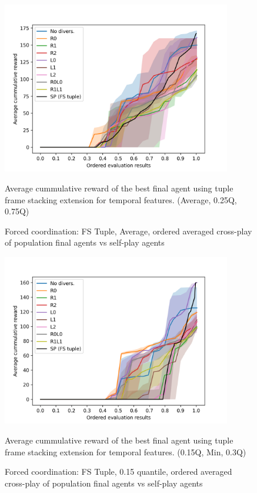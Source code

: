 \begin{figure}[!ht]
    \centering
    \includegraphics*[width=10cm]{../img/FSTupleOrderedAvg.png}

    \caption{Forced coordination: FS Tuple, Average, ordered averaged cross-play of population final agents vs self-play agents}
    \label{FSTupleOrderedAvg}
    \medskip
    \small 
    Average cummulative reward of the best final agent using tuple frame stacking extension for temporal features.    
    (Average, 0.25Q, 0.75Q)

\end{figure}

\begin{figure}[!ht]
    \centering
    \includegraphics*[width=10cm]{../img/FSTupleOrderedQ15.png}

    \caption{Forced coordination: FS Tuple, 0.15 quantile, ordered averaged cross-play of population final agents vs self-play agents}
    \label{FSTupleOrderedQ15}
    \medskip
    \small 
    Average cummulative reward of the best final agent using tuple frame stacking extension for temporal features.    
    (0.15Q, Min, 0.3Q)

\end{figure}

